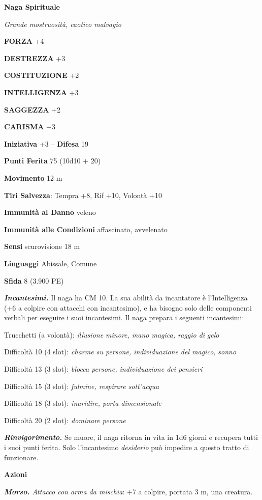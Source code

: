 \begin{multicols}{2}
\medskip{}\textbf{Naga Spirituale}

\emph{Grande mostruosità, caotico malvagio}

\textbf{FORZA} +4

\textbf{DESTREZZA} +3

\textbf{COSTITUZIONE} +2

\textbf{INTELLIGENZA} +3

\textbf{SAGGEZZA} +2

\textbf{CARISMA} +3

\textbf{Iniziativa} +3 -- \textbf{Difesa} 19

\textbf{Punti Ferita} 75 (10d10 + 20)

\textbf{Movimento} 12 m

\textbf{Tiri Salvezza}: Tempra +8, Rif +10, Volontà +10

\textbf{Immunità al Danno} veleno

\textbf{Immunità alle Condizioni} affascinato, avvelenato

\textbf{Sensi} scurovisione 18 m

\textbf{Linguaggi} Abissale, Comune

\textbf{Sfida} 8 (3.900 PE)

\emph{\textbf{Incantesimi.}} Il naga ha CM 10. La sua abilità da incantatore è l'Intelligenza (+6 a colpire con attacchi con incantesimo), e ha bisogno solo delle componenti verbali per eseguire i suoi incantesimi. Il naga prepara i seguenti incantesimi:

Trucchetti (a volontà): \emph{illusione minore, mano magica, raggio di}
\emph{gelo}

Difficoltà 10 (4 slot): \emph{charme su persone, individuazione del
	magico,} \emph{sonno}

Difficoltà 13 (3 slot): \emph{blocca persone, individuazione dei pensieri}

Difficoltà 15 (3 slot): \emph{fulmine, respirare sott'acqua}

Difficoltà 18 (3 slot): \emph{inaridire, porta dimensionale}

Difficoltà 20 (2 slot): \emph{dominare persone}

\emph{\textbf{Rinvigorimento.}} Se muore, il naga ritorna in vita in 1d6 giorni e recupera tutti i suoi punti ferita. Solo l'incantesimo \emph{desiderio} può impedire a questo tratto di funzionare.

\textbf{Azioni}

\emph{\textbf{Morso.} Attacco con arma da mischia}: +7 a colpire, portata 3 m, una creatura.


\end{multicols}
